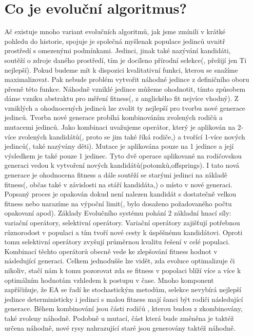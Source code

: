 \section{Co je evoluční algoritmus?}
Ač existuje mnoho variant evolučních algoritmů, jak jsme zmínili v krátké pohledu do historie, spojuje je společná myšlenak populace jedinců uvnitř prostředí s omezenými podmínkami. Jedinci, jinak také nazývání kandidáti, soutěží o zdroje daného prostředí, tím je docíleno přírodní selekce(, přežijí jen Ti nejlepší). Pokud budeme mít k dispozici kvalitativní funkci, kterou se snažíme maximalizovat. Pak nebude problém vytvořit náhodné jedince z definičního oboru přesně této funkce. Náhodně vzniklé jedince můžeme ohodnotit, tímto způsobem dáme vzniku abstraktu pro měření fitness(, z anglického fit nejvíce vhodný). Z vzniklých a ohodnocených jedinců lze zvolit ty nejlepší pro tvorbu nové generace jedinců. Tvorba nové generace probíhá kombinováním zvolených rodičů a mutacemi jedinců. Jako kombinaci uvažujeme operátor, který je aplikován na 2-více zvolených kandidátů(, proto se jim také říká rodiče,) a tvořící 1-více nových jedinců(, také nazývány děti). Mutace je aplikována pouze na 1 jedince a její výsledkem je také pouze 1 jedinec. Tyto dvě operace aplikované na rodičovskou generaci vedou k vytvoření nových kandidátů(potomků,offsprings). I tato nová generace je ohodnocena fitness a dále soutěží se starými jedinci na základě fitness(, občas také v závislosti na stáří kandidáta,) o místo v nové generaci. Popsaný proces je opakován dokud není nalezen kandidát s dostatečně velkou fitness nebo narazíme na výpoční limit(, bylo dosaženo požadovaného počtu opakovaní apod). Základy Evolučního systému pohání 2 základní hnací síly: variační operátory, selektivní operátory. Variační operátory zajišťují potřebnou různorodost v populaci a tím tvoří nové cesty k úspěšnému kandidátovi. Oproti tomu selektivní operátory zvyšují průměrnou kvalitu řešení v celé populaci. Kombinací těchto operátorů obecně vede ke zlepšování fitness hodnot v následující generaci. Celkem jednodušše lze vidět, zda evoluce optimalizuje či nikoliv, stačí nám k tomu pozorovat zda se fitness v popolaci blíží více a více k optimálním hodnotám vzhledem k postupu v čase. Mnoho komponent zapříčiňuje, že EA se řadí ke stochastickým metodům, selekce nevybírá nejlepší jedince deterministicky i jedinci s malou fitness mají šanci být rodiči následující generace. Během kombinování jsou části rodičů , kterou budou z zkombinovány, také zvoleny náhodně. Podobně u mutací, část která bude změněna je taktéž určena náhodně, nové rysy nahrazující staré jsou generovány taktéž náhodně.  
